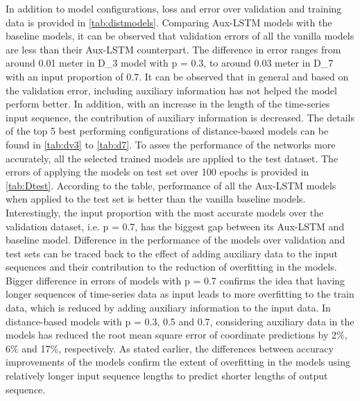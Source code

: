 In addition to model configurations, loss and error over validation and training data is provided in \cref{tab:distmodels}. Comparing Aux-LSTM models with the baseline models, it can be observed that validation errors of all the vanilla models are less than their Aux-LSTM counterpart. The difference in error ranges from around 0.01 meter in D\_3 model with p = 0.3, to around 0.03 meter in D\_7 with an input proportion of 0.7. It can be observed that in general and based on the validation error, including auxiliary information has not helped the model perform better. In addition, with an increase in the length of the time-series input sequence, the contribution of auxiliary information is decreased. The details of the top 5 best performing configurations of distance-based models can be found in \cref{tab:dv3} to \cref{tab:d7}. To asses the performance of the networks more accurately, all the selected trained models are applied to the test dataset. The errors of applying the models on test set over 100 epochs is provided in \cref{tab:Dtest}. According to the table,  performance of all the Aux-LSTM models when applied to the test set is better than the vanilla baseline models. Interestingly, the input proportion with the most accurate models over the validation dataset, i.e. p = 0.7, has the biggest gap between its Aux-LSTM and baseline model. Difference in the performance of the models over validation and test sets can be traced back to the effect of adding auxiliary data to the input sequences and their contribution to the reduction of overfitting in the models. Bigger difference in errors of models with p = 0.7 confirms the idea that having longer sequences of time-series data as input leads to more overfitting to the train data, which is reduced by adding auxiliary information to the input data. In distance-based models with p = 0.3, 0.5 and 0.7, considering auxiliary data in the models has reduced the root mean square error of coordinate predictions by 2\%, 6\% and 17\%, respectively. As stated earlier, the differences between accuracy improvements of the models confirm the extent of overfitting in the models using relatively longer input sequence lengths to predict shorter lengths of output sequence. 

